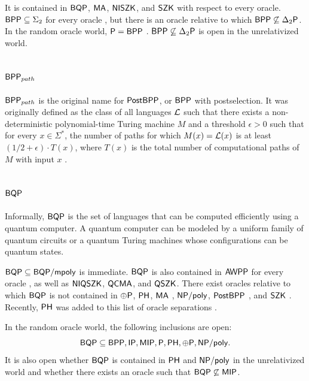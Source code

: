 It is contained in $\mathsf{BQP}$, $\mathsf{MA}$, $\mathsf{NISZK}$,  and $\mathsf{SZK}$ with
respect to every oracle. $\mathsf{BPP}\subseteq\Sigma_2$ for every oracle 
\cite{lautemann1983bpp}, but there is an oracle relative to which 
$\mathsf{BPP}\not\subseteq\Delta_2\mathsf{P}$. In the random oracle world, $\mathsf{P}=\mathsf{BPP}$
\cite{bennett1981relative}. $\mathsf{BPP}\not\subseteq\Delta_2\mathsf{P}$ is open in the 
unrelativized world.

\subsection{$\mathsf{BPP}_{path}$}

$\mathsf{BPP}_{path}$ is the original name for $\mathsf{PostBPP}$, or $\mathsf{BPP}$ with 
postselection. It was originally defined as the class of all languages $\mathcal{L}$ such 
that there exists a non-deterministic polynomial-time Turing machine $M$ and a 
threshold $\epsilon>0$ such that for every $x\in\Sigma^*$, the number of paths for
which $M(x)=\mathcal{L}(x)$ is at least $(1/2+\epsilon)\cdot T(x)$, where $T(x)$ is the 
total number of computational paths of $M$ with input $x$  
\cite{han1997threshold}.

\subsection{$\mathsf{BQP}$}

Informally, $\mathsf{BQP}$ is the set of languages that can be computed efficiently
using a quantum computer. A quantum computer can be modeled by a uniform family 
of quantum circuits or a quantum Turing machines whose configurations can be 
quantum states.

$\mathsf{BQP}\subseteq\mathsf{BQP}/\mathsf{mpoly}$ is immediate. $\mathsf{BQP}$ is also 
contained in $\mathsf{AWPP}$ for every oracle \cite{fortnow1998complexity}, as well
as $\mathsf{NIQSZK}$, $\mathsf{QCMA}$, and $\mathsf{QSZK}$. There exist oracles relative 
to which $\mathsf{BQP}$ is not contained in $\oplus\mathsf{P}$, $\mathsf{PH}$, $\mathsf{MA}$ 
\cite{watrous2000succinct}, $\mathsf{NP}/\mathsf{poly}$, $\mathsf{PostBPP}$ \cite{aaronson2010bqp} 
\cite{chen2016note},
and $\mathsf{SZK}$ \cite{childs2003exponential}. Recently, $\mathsf{PH}$ was added to 
this list of oracle separations \cite{raz2018oracle}.

In the random oracle world, the following inclusions are open:
\[
\mathsf{BQP}\subseteq\mathsf{BPP},\mathsf{IP},\mathsf{MIP},\mathsf{P},\mathsf{PH},\oplus\mathsf{P},\mathsf{NP}/\mathsf{poly}.
\]
It is also open whether $\mathsf{BQP}$ is contained in $\mathsf{PH}$ and $\mathsf{NP}/\mathsf{poly}$ 
in the unrelativized world and whether there exists an oracle such that 
$\mathsf{BQP}\not\subseteq\mathsf{MIP}$.

